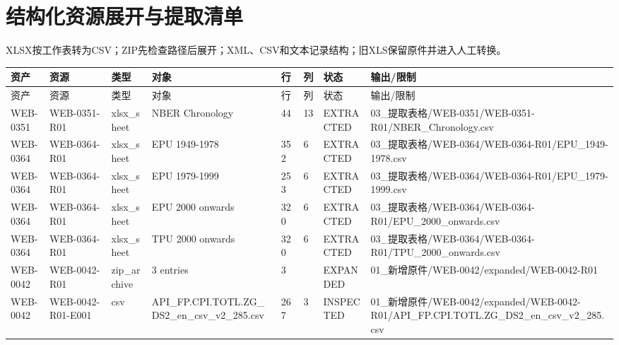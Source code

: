 \chapter{结构化资源展开与提取清单}
XLSX按工作表转为CSV；ZIP先检查路径后展开；XML、CSV和文本记录结构；旧XLS保留原件并进入人工转换。
\clearpage
\begin{landscape}\begingroup\setlength{\tabcolsep}{2pt}\scriptsize
\begin{longtable}{p{1.8cm}p{2.2cm}p{3.1cm}p{4.7cm}p{1.3cm}p{1.3cm}p{3.0cm}p{5.3cm}}
\toprule
资产 & 资源 & 类型 & 对象 & 行 & 列 & 状态 & 输出/限制\\
\midrule\endfirsthead
\toprule 资产 & 资源 & 类型 & 对象 & 行 & 列 & 状态 & 输出/限制\\\midrule\endhead
WEB-0351 & WEB-0351-R01 & xlsx\_\allowbreak{}sheet & NBER Chronology & 44 & 13 & EXTRACTED & 03\_\allowbreak{}提取表格/\allowbreak{}WEB-0351/\allowbreak{}WEB-0351-R01/\allowbreak{}NBER\_\allowbreak{}Chronology.csv\\
WEB-0364 & WEB-0364-R01 & xlsx\_\allowbreak{}sheet & EPU 1949-1978 & 352 & 6 & EXTRACTED & 03\_\allowbreak{}提取表格/\allowbreak{}WEB-0364/\allowbreak{}WEB-0364-R01/\allowbreak{}EPU\_\allowbreak{}1949-1978.csv\\
WEB-0364 & WEB-0364-R01 & xlsx\_\allowbreak{}sheet & EPU 1979-1999 & 253 & 6 & EXTRACTED & 03\_\allowbreak{}提取表格/\allowbreak{}WEB-0364/\allowbreak{}WEB-0364-R01/\allowbreak{}EPU\_\allowbreak{}1979-1999.csv\\
WEB-0364 & WEB-0364-R01 & xlsx\_\allowbreak{}sheet & EPU 2000 onwards & 320 & 6 & EXTRACTED & 03\_\allowbreak{}提取表格/\allowbreak{}WEB-0364/\allowbreak{}WEB-0364-R01/\allowbreak{}EPU\_\allowbreak{}2000\_\allowbreak{}onwards.csv\\
WEB-0364 & WEB-0364-R01 & xlsx\_\allowbreak{}sheet & TPU 2000 onwards & 320 & 6 & EXTRACTED & 03\_\allowbreak{}提取表格/\allowbreak{}WEB-0364/\allowbreak{}WEB-0364-R01/\allowbreak{}TPU\_\allowbreak{}2000\_\allowbreak{}onwards.csv\\
WEB-0042 & WEB-0042-R01 & zip\_\allowbreak{}archive & 3 entries & 3 &  & EXPANDED & 01\_\allowbreak{}新增原件/\allowbreak{}WEB-0042/\allowbreak{}expanded/\allowbreak{}WEB-0042-R01\\
WEB-0042 & WEB-0042-R01-E001 & csv & API\_\allowbreak{}FP.CPI.TOTL.ZG\_\allowbreak{}DS2\_\allowbreak{}en\_\allowbreak{}csv\_\allowbreak{}v2\_\allowbreak{}285.csv & 267 & 3 & INSPECTED & 01\_\allowbreak{}新增原件/\allowbreak{}WEB-0042/\allowbreak{}expanded/\allowbreak{}WEB-0042-R01/\allowbreak{}API\_\allowbreak{}FP.CPI.TOTL.ZG\_\allowbreak{}DS2\_\allowbreak{}en\_\allowbreak{}csv\_\allowbreak{}v2\_\allowbreak{}285.csv\\

\end{longtable}
\end{landscape}
